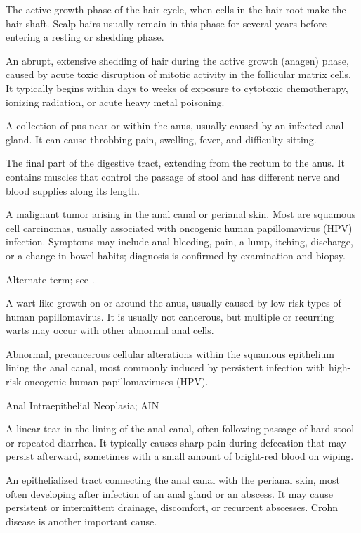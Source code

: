 The active growth phase of the hair cycle, when cells in the hair root make the hair shaft. Scalp hairs usually remain in this phase for several years before entering a resting or shedding phase.

 An abrupt, extensive shedding of hair during the active growth (anagen) phase, caused by acute toxic disruption of mitotic activity in the follicular matrix cells. It typically begins within days to weeks of exposure to cytotoxic chemotherapy, ionizing radiation, or acute heavy metal poisoning.

 A collection of pus near or within the anus, usually caused by an infected anal gland. It can cause throbbing pain, swelling, fever, and difficulty sitting.

 The final part of the digestive tract, extending from the rectum to the anus. It contains muscles that control the passage of stool and has different nerve and blood supplies along its length.

 A malignant tumor arising in the anal canal or perianal skin. Most are squamous
cell carcinomas, usually associated with oncogenic human papillomavirus (HPV) infection. Symptoms may
include anal bleeding, pain, a lump, itching, discharge, or a change in bowel habits; diagnosis is
confirmed by examination and biopsy.

 Alternate term; see .

 A wart-like growth on or around the anus, usually caused by low-risk types of human papillomavirus. It is usually not cancerous, but multiple or recurring warts may occur with other abnormal anal cells.

 Abnormal, precancerous cellular alterations within the squamous epithelium lining the anal canal, most commonly induced by persistent infection with high-risk oncogenic human papillomaviruses (HPV).

\synonyms
Anal Intraepithelial Neoplasia; AIN

 A linear tear in the lining of the anal canal, often following passage of hard
stool or repeated diarrhea. It typically causes sharp pain during defecation that may persist
afterward, sometimes with a small amount of bright-red blood on wiping.

 An epithelialized tract connecting the anal canal with the perianal skin, most
often developing after infection of an anal gland or an abscess. It may cause persistent or intermittent
drainage, discomfort, or recurrent abscesses. Crohn disease is another important cause.

